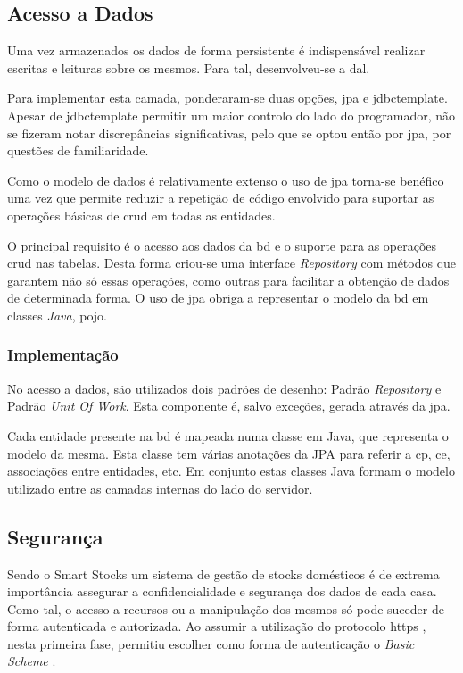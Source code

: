 %
%
\subsection{Acesso a Dados}\label{subsec422}

Uma vez armazenados os dados de forma persistente é indispensável realizar escritas e leituras sobre os mesmos. Para tal, desenvolveu-se a \acrfull{dal}. 

Para implementar esta camada, ponderaram-se duas opções, \gls{jpa} e \gls{jdbctemplate}. Apesar de \acrshort{jdbctemplate} permitir um maior controlo do lado do programador, não se fizeram notar discrepâncias significativas, pelo que se optou então por \acrshort{jpa}, por questões de familiaridade.

Como o modelo de dados é relativamente extenso o uso de \acrshort{jpa} torna-se benéfico uma vez que permite reduzir a repetição de código envolvido para suportar as operações básicas de \acrfull{crud} em todas as entidades. 

O principal requisito é o acesso aos dados da \acrshort{bd} e o suporte para as operações \acrshort{crud} nas tabelas. Desta forma criou-se uma interface \textit{Repository} com métodos que garantem não só essas operações, como outras para facilitar a obtenção de dados de determinada forma. O uso de \acrshort{jpa} obriga a representar o modelo da \acrshort{bd} em classes \textit{Java}, \acrfull{pojo}.

\subsubsection{Implementação}\label{subsubsec4221}

No acesso a dados, são utilizados dois padrões de desenho: Padrão \textit{Repository} e Padrão \textit{Unit Of Work}. Esta componente é, salvo exceções, gerada através da \acrshort{jpa}.

Cada entidade presente na \acrshort{bd} é mapeada numa classe em Java, que representa o modelo da mesma. Esta classe tem várias anotações da JPA para referir a \acrlong{cp}, \acrlong{ce}, associações entre entidades, etc. Em conjunto estas classes Java formam o modelo utilizado entre as camadas internas do lado do servidor.


%
%
\subsection{Segurança}\label{subsec423}

Sendo o Smart Stocks um sistema de gestão de stocks domésticos é de extrema importância assegurar a confidencialidade e segurança dos dados de cada casa. Como tal, o acesso a recursos ou a manipulação dos mesmos só pode suceder de forma autenticada e autorizada. Ao assumir a utilização do protocolo \acrfull{https} \cite{RFC2660:https}, nesta primeira fase, permitiu escolher como forma de autenticação o \textit{Basic Scheme} \cite{RFC7617:basicSheme} .


